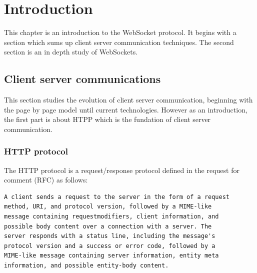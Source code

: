 \chapter{Introduction}
\label{Chapter1}

This chapter is an introduction to the WebSocket protocol.  It begins with a
section which sums up client server communication techniques.  The second
section is an in depth study of WebSockets.

\section{Client server communications}

This section studies the evolution of client server communication, beginning
with the page by page model until current technologies. However as an
introduction, the first part is about HTPP which is the fundation of client
server communication.

\subsection{HTTP protocol}

The HTTP protocol is a request/response protocol defined in the request for
comment (RFC) \cite{Reference1} as follows:

\begin{verbatim} 
A client sends a request to the server in the form of a request 
method, URI, and protocol version, followed by a MIME-like 
message containing requestmodifiers, client information, and 
possible body content over a connection with a server. The 
server responds with a status line, including the message's
protocol version and a success or error code, followed by a 
MIME-like message containing server information, entity meta 
information, and possible entity-body content.  
\end{verbatim}

